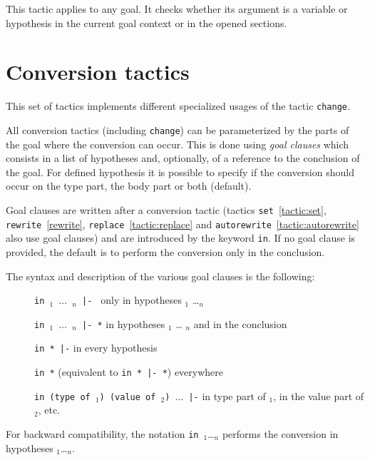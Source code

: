\begin{coq_example*}
This tactic applies to any goal. It checks whether its argument is a
variable or hypothesis in the current goal context or in the opened sections.

\ErrMsg {}

\section{Conversion tactics
\label{Conversion-tactics}}

This set of tactics implements different specialized usages of the
tactic \texttt{change}.

All conversion tactics (including \texttt{change}) can be
parameterized by the parts of the goal where the conversion can
occur. This is done using \emph{goal clauses} which consists in a list
of hypotheses and, optionally, of a reference to the conclusion of the
goal. For defined hypothesis it is possible to specify if the
conversion should occur on the type part, the body part or both
(default).

Goal clauses are written after a conversion tactic (tactics
\texttt{set}~\ref{tactic:set},          \texttt{rewrite}~\ref{rewrite},
\texttt{replace}~\ref{tactic:replace}                               and
\texttt{autorewrite}~\ref{tactic:autorewrite} also use goal clauses)  and
are introduced by  the keyword \texttt{in}. If no goal clause is provided,
the default is to perform the conversion only in the conclusion.

The syntax and description of the various goal clauses is the following:
\begin{description}
\item[]\texttt{in {\ident}$_1$ $\ldots$ {\ident}$_n$ |- } only in hypotheses {\ident}$_1$
  \ldots {\ident}$_n$
\item[]\texttt{in {\ident}$_1$ $\ldots$ {\ident}$_n$ |- *} in hypotheses {\ident}$_1$ \ldots
  {\ident}$_n$ and in the conclusion
\item[]\texttt{in * |-} in every hypothesis
\item[]\texttt{in *} (equivalent to \texttt{in * |- *}) everywhere
\item[]\texttt{in (type of {\ident}$_1$) (value of {\ident}$_2$) $\ldots$ |-} in
  type part of {\ident}$_1$, in the value part of {\ident}$_2$, etc.
\end{description}

For backward compatibility, the notation \texttt{in}~{\ident}$_1$\ldots {\ident}$_n$
performs the conversion in hypotheses {\ident}$_1$\ldots {\ident}$_n$.


\end{coq_example*}
